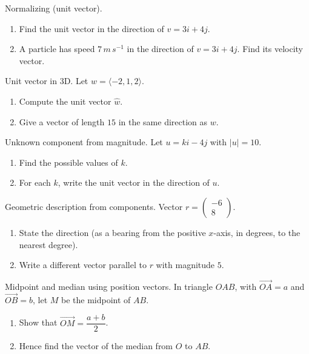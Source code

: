 \documentclass[11pt]{article}
\def\textbf#1{#1}%
\def\mathbf#1{#1}%
\def\mathrm#1{#1}%
\newcounter{question}
\begin{document}
\begin{question}
\textbf{Normalizing (unit vector).}
\begin{enumerate}
  \item Find the unit vector in the direction of $\mathbf{v}=3\mathbf{i}+4\mathbf{j}$.
  \item A particle has speed $7\,\mathrm{m\,s^{-1}}$ in the direction of $\mathbf{v}=3\mathbf{i}+4\mathbf{j}$. Find its velocity vector.
\end{enumerate}
\end{question}

\begin{question}
\textbf{Unit vector in 3D.}
Let $\mathbf{w}=\langle -2,1,2\rangle$.
\begin{enumerate}
  \item Compute the unit vector $\hat{\mathbf{w}}$.
  \item Give a vector of length $15$ in the same direction as $\mathbf{w}$.
\end{enumerate}
\end{question}

\begin{question}
\textbf{Unknown component from magnitude.}
Let $\mathbf{u}=k\mathbf{i}-4\mathbf{j}$ with $|\mathbf{u}|=10$.
\begin{enumerate}
  \item Find the possible values of $k$.
  \item For each $k$, write the unit vector in the direction of $\mathbf{u}$.
\end{enumerate}
\end{question}

\begin{question}
\textbf{Geometric description from components.}
Vector $\mathbf{r}=\begin{pmatrix}-6\\8\end{pmatrix}$.
\begin{enumerate}
  \item State the direction (as a bearing from the positive $x$-axis, in degrees, to the nearest degree).
  \item Write a different vector parallel to $\mathbf{r}$ with magnitude $5$.
\end{enumerate}
\end{question}

\begin{question}
\textbf{Midpoint and median using position vectors.}
In triangle $OAB$, with $\overrightarrow{OA}=\mathbf{a}$ and $\overrightarrow{OB}=\mathbf{b}$, let $M$ be the midpoint of $AB$.
\begin{enumerate}
  \item Show that $\overrightarrow{OM}=\dfrac{\mathbf{a}+\mathbf{b}}{2}$.
  \item Hence find the vector of the median from $O$ to $AB$.
\end{enumerate}
\end{question}
\end{document}

